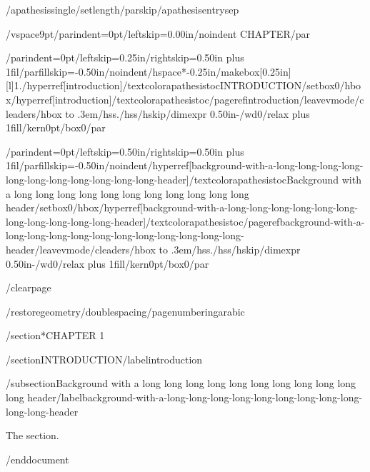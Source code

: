 {/apathesissingle/setlength{/parskip}{/apathesisentrysep}

/vspace{9pt}{/parindent=0pt/leftskip=0.00in/noindent CHAPTER/par}

{/parindent=0pt/leftskip=0.25in/rightskip=0.50in plus 1fil/parfillskip=-0.50in/noindent/hspace*{-0.25in}/makebox[0.25in][l]{1.}/hyperref[introduction]{/textcolor{apathesistoc}{INTRODUCTION}}/setbox0/hbox{/hyperref[introduction]{/textcolor{apathesistoc}{/pageref{introduction}}}}/leavevmode/cleaders/hbox to .3em{/hss./hss}/hskip/dimexpr 0.50in-/wd0/relax plus 1fill/kern0pt/box0/par}

{/parindent=0pt/leftskip=0.50in/rightskip=0.50in plus 1fil/parfillskip=-0.50in/noindent/hyperref[background-with-a-long-long-long-long-long-long-long-long-long-long-long-header]{/textcolor{apathesistoc}{Background with a long long long long long long long long long long long
header}}/setbox0/hbox{/hyperref[background-with-a-long-long-long-long-long-long-long-long-long-long-long-header]{/textcolor{apathesistoc}{/pageref{background-with-a-long-long-long-long-long-long-long-long-long-long-long-header}}}}/leavevmode/cleaders/hbox to .3em{/hss./hss}/hskip/dimexpr 0.50in-/wd0/relax plus 1fill/kern0pt/box0/par}

}

/clearpage

/restoregeometry/doublespacing/pagenumbering{arabic}

/section*{CHAPTER 1}

/section{INTRODUCTION}/label{introduction}

/subsection{Background with a long long long long long long long long
long long long
header}/label{background-with-a-long-long-long-long-long-long-long-long-long-long-long-header}

The section.




/end{document}
